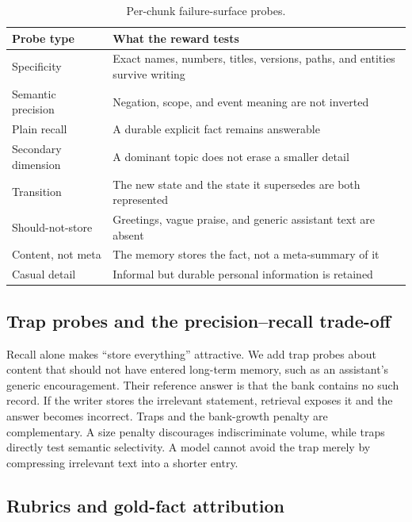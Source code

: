 \documentclass{article}
\renewcommand{\arraystretch}{1.08}
\begin{document}
\begin{table}[t]
\centering
\small
\setlength{\tabcolsep}{5pt}
\renewcommand{\arraystretch}{1.12}
\begin{tabularx}{\linewidth}{@{}p{3.05cm}Y@{}}
\toprule
Probe type & What the reward tests \\
\midrule
Specificity & Exact names, numbers, titles, versions, paths, and entities survive writing \\
Semantic precision & Negation, scope, and event meaning are not inverted \\
Plain recall & A durable explicit fact remains answerable \\
Secondary dimension & A dominant topic does not erase a smaller detail \\
Transition & The new state and the state it supersedes are both represented \\
Should-not-store & Greetings, vague praise, and generic assistant text are absent \\
Content, not meta & The memory stores the fact, not a meta-summary of it \\
Casual detail & Informal but durable personal information is retained \\
\bottomrule
\end{tabularx}
\caption{Per-chunk failure-surface probes.}
\label{tab:taxonomy}
\end{table}

\subsection{Trap probes and the precision--recall trade-off}

Recall alone makes ``store everything'' attractive. We add trap probes about content that should not have entered long-term memory, such as an assistant's generic encouragement. Their reference answer is that the bank contains no such record. If the writer stores the irrelevant statement, retrieval exposes it and the answer becomes incorrect. Traps and the bank-growth penalty are complementary. A size penalty discourages indiscriminate volume, while traps directly test semantic selectivity. A model cannot avoid the trap merely by compressing irrelevant text into a shorter entry.

\subsection{Rubrics and gold-fact attribution}
\label{sec:gold}
\end{document}
